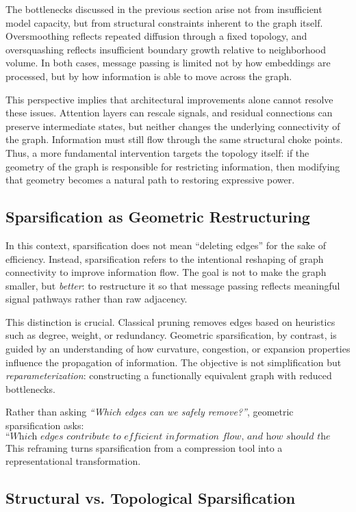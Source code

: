 \documentclass[letterpaper,12pt]{article}
\begin{document}
The bottlenecks discussed in the previous section arise not from insufficient model capacity, but from structural constraints inherent to the graph itself. Oversmoothing reflects repeated diffusion through a fixed topology, and oversquashing reflects insufficient boundary growth relative to neighborhood volume. In both cases, message passing is limited not by how embeddings are processed, but by how information is able to move across the graph.

This perspective implies that architectural improvements alone cannot resolve these issues. Attention layers can rescale signals, and residual connections can preserve intermediate states, but neither changes the underlying connectivity of the graph. Information must still flow through the same structural choke points. Thus, a more fundamental intervention targets the topology itself: if the geometry of the graph is responsible for restricting information, then modifying that geometry becomes a natural path to restoring expressive power.

\subsection{Sparsification as Geometric Restructuring}

In this context, sparsification does not mean ``deleting edges'' for the sake of efficiency. Instead, sparsification refers to the intentional reshaping of graph connectivity to improve information flow. The goal is not to make the graph smaller, but \emph{better}: to restructure it so that message passing reflects meaningful signal pathways rather than raw adjacency.

This distinction is crucial. Classical pruning removes edges based on heuristics such as degree, weight, or redundancy. Geometric sparsification, by contrast, is guided by an understanding of how curvature, congestion, or expansion properties influence the propagation of information. The objective is not simplification but \textit{reparameterization}: constructing a functionally equivalent graph with reduced bottlenecks.

Rather than asking \emph{“Which edges can we safely remove?”}, geometric sparsification asks:
\[
\textit{“Which edges contribute to efficient information flow, and how should the graph be reorganized to emphasize them?”}
\]
This reframing turns sparsification from a compression tool into a representational transformation.

\subsection{Structural vs. Topological Sparsification}
\end{document}
